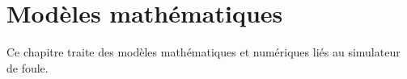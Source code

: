 \chapter{Modèles mathématiques}
%
Ce chapitre traite des modèles mathématiques et numériques liés au simulateur de foule.
%

%
